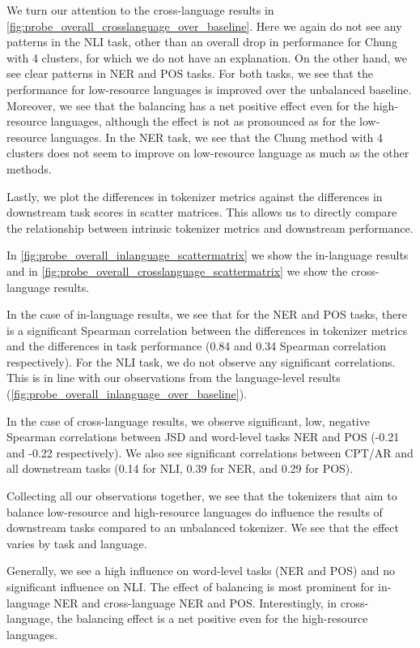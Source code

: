 We turn our attention to the cross-language results in \autoref{fig:probe_overall_crosslanguage_over_baseline}. Here we again do not see any patterns in the NLI task, other than an overall drop in performance for Chung with 4 clusters, for which we do not have an explanation. On the other hand, we see clear patterns in NER and POS tasks. For both tasks, we see that the performance for low-resource languages is improved over the unbalanced baseline. Moreover, we see that the balancing has a net positive effect even for the high-resource languages, although the effect is not as pronounced as for the low-resource languages. In the NER task, we see that the Chung method with 4 clusters does not seem to improve on low-resource language as much as the other methods. 

Lastly, we plot the differences in tokenizer metrics against the differences in downstream task scores in scatter matrices. This allows us to directly compare the relationship between intrinsic tokenizer metrics  and downstream performance.

In \autoref{fig:probe_overall_inlanguage_scattermatrix} we show the in-language results and in \autoref{fig:probe_overall_crosslanguage_scattermatrix} we show the cross-language results. 

In the case of in-language results, we see that for the NER and POS tasks, there is a significant Spearman correlation between the differences in tokenizer metrics and the differences in task performance (0.84 and 0.34 Spearman correlation respectively). For the NLI task, we do not observe any significant correlations. This is in line with our observations from the language-level results (\autoref{fig:probe_overall_inlanguage_over_baseline}). 

In the case of cross-language results, we observe significant, low, negative Spearman correlations between JSD and word-level tasks NER and POS (-0.21 and -0.22 respectively). We also see significant correlations between CPT/AR and all downstream tasks (0.14 for NLI, 0.39 for NER, and 0.29 for POS).

Collecting all our observations together, we see that the tokenizers that aim to balance low-resource and high-resource languages do influence the results of downstream tasks compared to an unbalanced tokenizer. We see that the effect varies by task and language.

Generally, we see a high influence on word-level tasks (NER and POS) and no significant influence on NLI. The effect of balancing is most prominent for in-language NER and cross-language NER and POS. Interestingly, in cross-language, the balancing effect is a net positive even for the high-resource languages.

